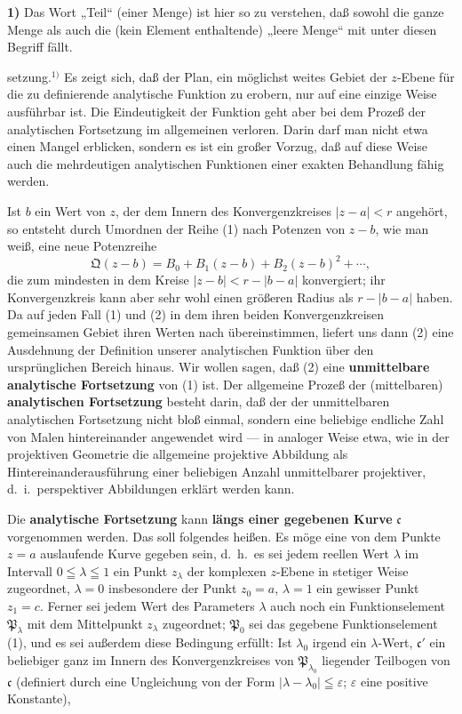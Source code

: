 \documentclass{article}
\begin{document}
\textbf{1)} Das Wort „Teil“ (einer Menge) ist hier so zu verstehen, daß sowohl die ganze Menge als auch die (kein Element enthaltende) „leere Menge“ mit unter diesen Begriff fällt.

setzung.${}^{1)}$ Es zeigt sich, daß der Plan, ein möglichst weites Gebiet der $z$-Ebene für die zu definierende analytische Funktion zu erobern, nur auf eine einzige Weise ausführbar ist. Die Eindeutigkeit der Funktion geht aber bei dem Prozeß der analytischen Fortsetzung im allgemeinen verloren. Darin darf man nicht etwa einen Mangel erblicken, sondern es ist ein großer Vorzug, daß auf diese Weise auch die mehrdeutigen analytischen Funktionen einer exakten Behandlung fähig werden.

Ist $b$ ein Wert von $z$, der dem Innern des Konvergenzkreises $|z - a| < r$ angehört, so entsteht durch Umordnen der Reihe (1) nach Potenzen von $z - b$, wie man weiß, eine neue Potenzreihe
\[ \mathfrak{Q}(z - b) = B_0 + B_1(z - b) + B_2(z - b)^2 + \cdots, \tag{2} \]
die zum mindesten in dem Kreise $|z - b| < r - |b - a|$ konvergiert; ihr Konvergenzkreis kann aber sehr wohl einen größeren Radius als $r - |b - a|$ haben. Da auf jeden Fall (1) und (2) in dem ihren beiden Konvergenzkreisen gemeinsamen Gebiet ihren Werten nach übereinstimmen, liefert uns dann (2) eine Ausdehnung der Definition unserer analytischen Funktion über den ursprünglichen Bereich hinaus. Wir wollen sagen, daß (2) eine \textbf{unmittelbare analytische Fortsetzung} von (1) ist. Der allgemeine Prozeß der (mittelbaren) \textbf{analytischen Fortsetzung} besteht darin, daß der der unmittelbaren analytischen Fortsetzung nicht bloß einmal, sondern eine beliebige endliche Zahl von Malen hintereinander angewendet wird --- in analoger Weise etwa, wie in der projektiven Geometrie die allgemeine projektive Abbildung als Hintereinanderausführung einer beliebigen Anzahl unmittelbarer projektiver, d.\ i.\ perspektiver Abbildungen erklärt werden kann.

Die \textbf{analytische Fortsetzung} kann \textbf{längs einer gegebenen Kurve} $\mathfrak{c}$ vorgenommen werden. Das soll folgendes heißen. Es möge eine von dem Punkte $z = a$ auslaufende Kurve gegeben sein, d.\ h.\ es sei jedem reellen Wert $\lambda$ im Intervall $0 \leqq \lambda \leqq 1$ ein Punkt $z_\lambda$ der komplexen $z$-Ebene in stetiger Weise zugeordnet, $\lambda = 0$ insbesondere der Punkt $z_0 = a$, $\lambda = 1$ ein gewisser Punkt $z_1 = c$. Ferner sei jedem Wert des Parameters $\lambda$ auch noch ein Funktionselement $\mathfrak{P}_\lambda$ mit dem Mittelpunkt $z_\lambda$ zugeordnet; $\mathfrak{P}_0$ sei das gegebene Funktionselement (1), und es sei außerdem diese Bedingung erfüllt: Ist $\lambda_0$ irgend ein $\lambda$-Wert, $\mathfrak{c}'$ ein beliebiger ganz im Innern des Konvergenzkreises von $\mathfrak{P}_{\lambda_0}$ liegender Teilbogen von $\mathfrak{c}$ (definiert durch eine Ungleichung von der Form $|\lambda - \lambda_0| \leqq \varepsilon$; $\varepsilon$ eine positive Konstante),
\end{document}

